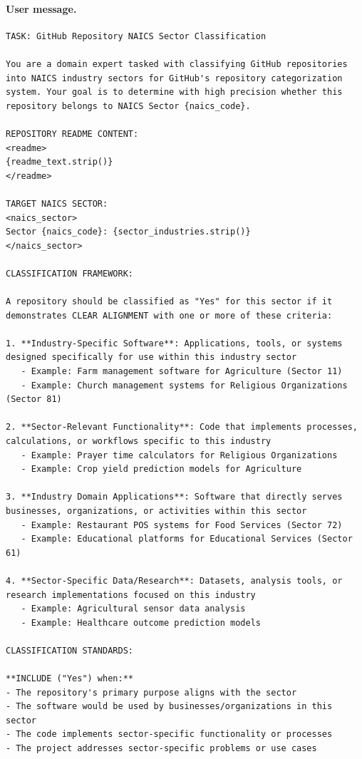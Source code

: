 \paragraph{User message.}
\begin{Verbatim}[fontsize=\footnotesize,breaklines=true,breakanywhere=true,breakindent=0pt,breaksymbolleft={\textcolor{gray}{\tiny$\hookrightarrow$}},frame=single,framesep=2mm,xleftmargin=0pt,xrightmargin=0pt]
TASK: GitHub Repository NAICS Sector Classification

You are a domain expert tasked with classifying GitHub repositories into NAICS industry sectors for GitHub's repository categorization system. Your goal is to determine with high precision whether this repository belongs to NAICS Sector {naics_code}.

REPOSITORY README CONTENT:
<readme>
{readme_text.strip()}
</readme>

TARGET NAICS SECTOR:
<naics_sector>
Sector {naics_code}: {sector_industries.strip()}
</naics_sector>

CLASSIFICATION FRAMEWORK:

A repository should be classified as "Yes" for this sector if it demonstrates CLEAR ALIGNMENT with one or more of these criteria:

1. **Industry-Specific Software**: Applications, tools, or systems designed specifically for use within this industry sector
   - Example: Farm management software for Agriculture (Sector 11)
   - Example: Church management systems for Religious Organizations (Sector 81)

2. **Sector-Relevant Functionality**: Code that implements processes, calculations, or workflows specific to this industry
   - Example: Prayer time calculators for Religious Organizations
   - Example: Crop yield prediction models for Agriculture

3. **Industry Domain Applications**: Software that directly serves businesses, organizations, or activities within this sector
   - Example: Restaurant POS systems for Food Services (Sector 72)
   - Example: Educational platforms for Educational Services (Sector 61)

4. **Sector-Specific Data/Research**: Datasets, analysis tools, or research implementations focused on this industry
   - Example: Agricultural sensor data analysis
   - Example: Healthcare outcome prediction models

CLASSIFICATION STANDARDS:

**INCLUDE ("Yes") when:**
- The repository's primary purpose aligns with the sector
- The software would be used by businesses/organizations in this sector
- The code implements sector-specific functionality or processes
- The project addresses sector-specific problems or use cases


\end{Verbatim}
